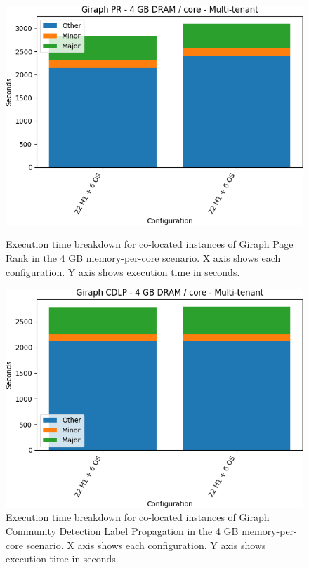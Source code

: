 \begin{figure}[thbp]
        \centering
    \includegraphics[width=\linewidth]{./fig/g_pr64.png}
    \caption{Execution time breakdown for co-located instances of Giraph
    Page Rank in the 4 GB memory-per-core scenario. X axis shows each configuration.
	Y axis shows execution time in seconds.}
    \label{fig:g_pr64}
    \includegraphics[width=\linewidth]{./fig/g_cdlp64.png}
    \caption{Execution time breakdown for co-located instances of Giraph
    Community Detection Label Propagation in the 4 GB memory-per-core scenario. X axis shows each configuration. 
	Y axis shows execution time in seconds.}
    \label{fig:g_cdlp64}
\end{figure}

